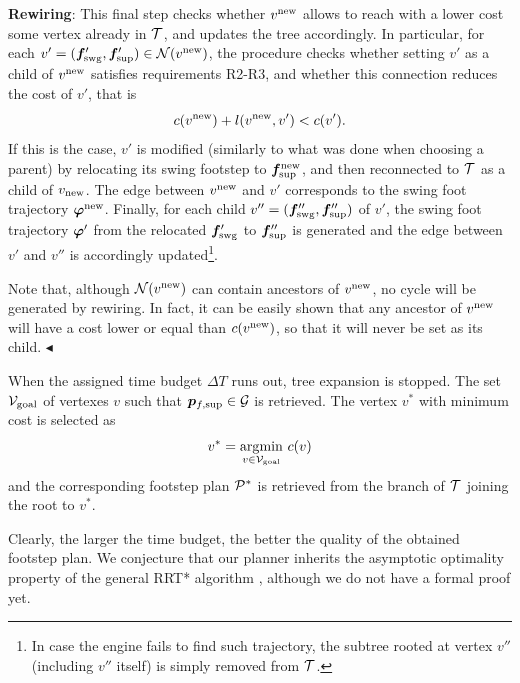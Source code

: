 {\bf Rewiring}: This final step checks whether $v^{\rm new}$ allows to reach with a lower cost some vertex already in $\cal T$, and updates the tree accordingly. In particular, for each $v' = ({\bm{f}}'_{\rm swg}, {\bm{f}}'_{\rm sup}) \in {\cal N} (v^{\rm new})$, the procedure checks whether setting $v'$ as a child of $v^{\rm new}$ satisfies requirements R2-R3, and whether this connection reduces the cost of $v'$, that is 
\[
c(v^{\rm new}) + l(v^{\rm new}, v') < c(v').
\]
If this is the case, $v'$ is modified (similarly to what was done when choosing a parent) by relocating its swing footstep to ${\bm{f}}_{\rm sup}^{\rm new}$, and then  reconnected to $\cal T$ as a child of $v_{\rm new}$. The edge between $v^{\rm new}$ and $v'$ corresponds to the swing foot trajectory ${\bm{\varphi}}^{\rm new}$.
Finally, for each child $v'' = ({\bm{f}}''_{\rm swg}, {\bm{f}}''_{\rm sup})$ of $v'$, the swing foot trajectory ${\bm{\varphi}}'$ from the relocated ${\bm{f}}'_{\rm swg}$ to ${\bm{f}}''_{\rm sup}$ is generated and the edge between $v'$ and $v''$ is accordingly updated\footnote{In case the engine fails to find such trajectory, the subtree rooted at vertex $v''$ (including $v''$ itself) is simply removed from $\cal T$.}.

Note that, although ${\cal N} (v^{\rm new})$ can contain ancestors of $v^{\rm new}$, no cycle will be generated by rewiring.
In fact, it can be easily shown that any ancestor of $v^{\rm new}$ will have a cost lower or equal than $c(v^{\rm new})$, so that it will never be set as its child. \hfill $\blacktriangleleft$

\smallskip

When the assigned time budget ${\Delta T}$ runs out, tree expansion is stopped. The set ${\cal V}_{\rm goal}$ of vertexes $v$ such that ${\bm{p}}_{f,{\rm sup}} \in {\cal G}$ is retrieved.
The vertex $v^*$ with minimum cost is selected as
\begin{equation}
    \label{eq:WoS:BestVertex}
    v^* = \underset{v \in {\cal V}_{\rm goal}}{\arg\!\min} \ c(v)
\end{equation}
and the corresponding footstep plan ${\cal P}^*$ is retrieved from the branch of $\cal T$ joining the root to $v^*$.


Clearly, the larger the time budget, the better the quality of the obtained footstep plan. %
We conjecture that our planner inherits the asymptotic optimality property of the general RRT* algorithm \cite{KaFr:11}, although we do not have a formal proof yet.

